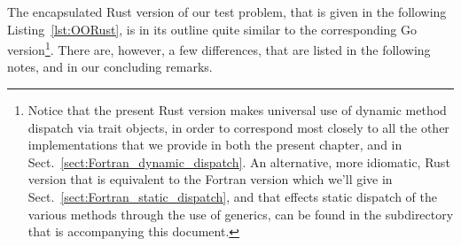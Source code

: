 \documentclass[11pt,oneside]{report}
\newcommand{\code}[1]{{\selectfont\ttfamily{#1}}}
\begin{document}
The encapsulated Rust version of our test problem, that is given in the
following Listing~\ref{lst:OORust}, is in its outline quite similar to
the corresponding Go version\footnote{Notice that the present Rust
version makes universal use of dynamic method dispatch via trait
objects, in order to correspond most closely to all the other
implementations that we provide in both the present chapter, and in
Sect.~\ref{sect:Fortran_dynamic_dispatch}. An alternative, more
idiomatic, Rust version that is equivalent to the Fortran version
which we'll give in Sect.~\ref{sect:Fortran_static_dispatch}, and that
effects static dispatch of the various \code{sum} methods through the
use of generics, can be found in the \code{Code} subdirectory that is
accompanying this document.}. There are, however, a few differences,
that are listed in the following notes, and in our concluding remarks.
\end{document}
